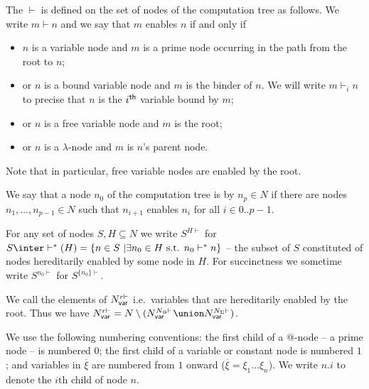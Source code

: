 \begin{definition}[Enabling]
The  $\vdash$ is defined on the set of
nodes of the computation tree as follows. We write $m \vdash n$ and
we say that $m$ enables $n$ if and only if
\begin{itemize}
\item $n$ is a variable node and $m$ is a prime node occurring in the path from the root to $n$;
\item or $n$ is a bound variable node and $m$ is the binder of $n$. We will write $m \vdash_i n$ to precise that $n$
is the $i^{\sf th}$ variable bound by $m$;
\item or $n$ is a free variable node and $m$ is the root;
\item or $n$ is a $\lambda$-node and $m$ is $n$'s parent node.
\end{itemize}
Note that in particular, free variable nodes are enabled by the root.
\end{definition}

We say that a node $n_0$ of the computation tree is  by $n_p \in N$ if there are nodes $n_1,\ldots, n_{p-1} \in N$ such that $n_{i+1}$ enables $n_{i}$
for all $i\in 0..p-1$.

For any set of nodes $S, H \subseteq N$ we write $S^{H\vdash}$ for $S \inter \vdash^*(H) = \{ n \in S \ | \exists n_0 \in H \mbox{ s.t. }n_0  \vdash^* n \}$ -- the subset of $S$ constituted of nodes hereditarily enabled by some node in $H$. For succinctness we sometime write $S^{n_0\vdash}$ for
$S^{\{n_0\}\vdash}$.

We call  the elements of $N_{\sf var}^{r\vdash}$ i.e.\
variables that are hereditarily enabled by the root. Thus we have
$N_{\sf var}^{r\vdash} = N \setminus ( N_{\sf var}^{N_@\vdash}
\union N_{\sf var}^{N_\Sigma\vdash})$.
\smallskip

We use the following numbering conventions:
the first child of a @-node -- a prime node -- is numbered $0$;
the first child of a variable or constant node is numbered $1$;
and variables in $\overline{\xi}$ are numbered from $1$ onward ($\overline{\xi} = \xi_1 \ldots \xi_n$).
We write $n.i$ to denote the $i$th child of node $n$.

